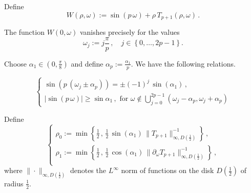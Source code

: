 \documentclass[12pt,a4paper]{amsart}
\theoremstyle{plain} %
\theoremstyle{definition}
\numberwithin{equation}{section}
\numberwithin{figure}{section}
\numberwithin{table}{section}
\newcommand{\set}[1]{\left\lbrace #1 \right\rbrace}
\begin{document}
Define
%
\begin{equation}\label{E-lsc-10}
W(\rho,\omega) := \sin(p\, \omega) + \rho\, T_{p+1}(\rho,\omega)\,.
\end{equation}

The function $W(0,\omega)$ vanishes precisely for the values
%
\begin{equation}\label{E-lsc-12}
\omega_j := j\frac{\pi}{p}\,, \quad j \in \set{0,\ldots,2p-1}.
\end{equation}

Choose $\alpha_1 \in \left( 0,\frac{\pi}{8} \right)$ and define
$\alpha_p := \frac{\alpha_1}{p}$. We have the following relations.



\begin{equation}\label{E-lsc-14}
\left\{
\begin{array}{l}
\sin\left(p\,(\omega_j \pm \alpha_p)\right) = \pm (-1)^j \, \sin(\alpha_1)\,,\\[5pt]
|\sin(p\, \omega)| \ge \sin \alpha_1\,, \text{~for~} \omega \not \in \bigcup_{j=0}^{2p-1}\left( \omega_j-\alpha_p,\omega_j+\alpha_p\right)
\end{array}%
\right.
\end{equation}

Define
%
\begin{equation}\label{E-lsc-16}
\left\{
\begin{array}{l}
\rho_0 := \min\set{\frac 12 \,,\, \frac 12 \, \sin(\alpha_1)\, \|T_{p+1}\|^{-1}_{\infty,D(\frac 12)}}\,,\\[5pt]
\rho_1 := \min\set{\frac 12 \,,\, \frac 12 \, \cos(\alpha_1)\, \|\partial_{\omega}T_{p+1}\|^{-1}_{\infty,D(\frac 12)}}\,,\\[5pt]
\end{array}%
\right.
\end{equation}
%
where $\|\cdot\|_{\infty,D(\frac 12)}$ denotes the $L^{\infty}$ norm of functions on the disk $D(\frac 12)$ of radius $\frac 12$.
\end{document}
